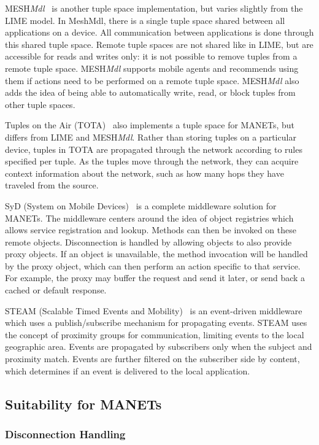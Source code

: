 MESH\textit{Mdl}~\cite{meshmdl}  is another tuple space implementation, but varies slightly from the LIME model. In MeshMdl, there is a single tuple space shared between all applications on a device. All communication between applications is done through this shared tuple space. Remote tuple spaces are not shared like in LIME, but are accessible for reads and writes only: it is not possible to remove tuples from a remote tuple space. MESH\textit{Mdl} supports mobile agents and recommends using them if actions need to be performed on a remote tuple space. MESH\textit{Mdl} also adds the idea of being able to automatically write, read, or block tuples from other tuple spaces.

Tuples on the Air (TOTA)~\cite{tota}  also implements a tuple space for MANETs, but differs from LIME and MESH\textit{Mdl}. Rather than storing tuples on a particular device, tuples in TOTA are propagated through the network according to rules specified per tuple. As the tuples move through the network, they can acquire context information about the network, such as how many hops they have traveled from the source.

SyD (System on Mobile Devices)~\cite{syd} is a complete middleware solution for MANETs. The middleware centers around the idea of object registries which allows service registration and lookup. Methods can then be invoked on these remote objects. Disconnection is handled by allowing objects to also provide proxy objects. If an object is unavailable, the method invocation will be handled by the proxy object, which can then perform an action specific to that service. For example, the proxy may buffer the request and send it later, or send back a cached or default response.

STEAM (Scalable Timed Events and Mobility)~\cite{steam} is an event-driven middleware which uses a publish/subscribe\cite{psfaces} mechanism for propagating events. STEAM uses the concept of proximity groups for communication, limiting events to the local geographic area. Events are propagated by subscribers only when the subject and proximity match. Events are further filtered on the subscriber side by content, which determines if an event is delivered to the local application.

\subsection{Suitability for MANETs}

\subsubsection{Disconnection Handling}

